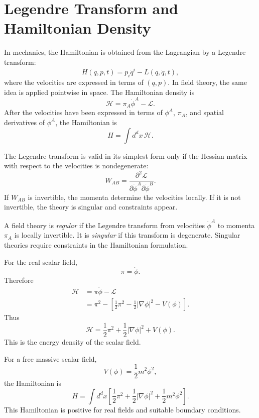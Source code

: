 \section{Legendre Transform and Hamiltonian Density}

In mechanics, the Hamiltonian is obtained from the Lagrangian by a Legendre
transform:
\[
    H(q,p,t)=p_i\dot q^i-L(q,\dot q,t),
\]
where the velocities are expressed in terms of \((q,p)\). In field theory, the
same idea is applied pointwise in space. The Hamiltonian density is
\[
    \mathcal{H}
    =\pi_A\dot\phi^A-\mathcal{L}.
\]
After the velocities have been expressed in terms of \(\phi^A\), \(\pi_A\), and
spatial derivatives of \(\phi^A\), the Hamiltonian is
\[
    H=\int d^d x\,\mathcal{H}.
\]

The Legendre transform is valid in its simplest form only if the Hessian matrix
with respect to the velocities is nondegenerate:
\[
    W_{AB}
    =\frac{\partial^2\mathcal{L}}
    {\partial\dot\phi^A\partial\dot\phi^B}.
\]
If \(W_{AB}\) is invertible, the momenta determine the velocities locally. If it
is not invertible, the theory is singular and constraints appear.

\begin{definitionbox}
A field theory is \emph{regular} if the Legendre transform from velocities
\(\dot\phi^A\) to momenta \(\pi_A\) is locally invertible. It is \emph{singular}
if this transform is degenerate. Singular theories require constraints in the
Hamiltonian formulation.
\end{definitionbox}

For the real scalar field,
\[
    \pi=\dot\phi.
\]
Therefore
\[
\begin{aligned}
    \mathcal{H}
    &=\pi\dot\phi-\mathcal{L} \\
    &=\pi^2-\left[\frac{1}{2}\pi^2
      -\frac{1}{2}|\nabla\phi|^2-V(\phi)\right].
\end{aligned}
\]
Thus
\[
    \mathcal{H}
    =\frac{1}{2}\pi^2+\frac{1}{2}|\nabla\phi|^2+V(\phi).
\]
This is the energy density of the scalar field.

\begin{examplebox}
For a free massive scalar field,
\[
    V(\phi)=\frac{1}{2}m^2\phi^2,
\]
the Hamiltonian is
\[
    H=\int d^d x\left[
        \frac{1}{2}\pi^2
        +\frac{1}{2}|\nabla\phi|^2
        +\frac{1}{2}m^2\phi^2
    \right].
\]
This Hamiltonian is positive for real fields and suitable boundary conditions.
\end{examplebox}

